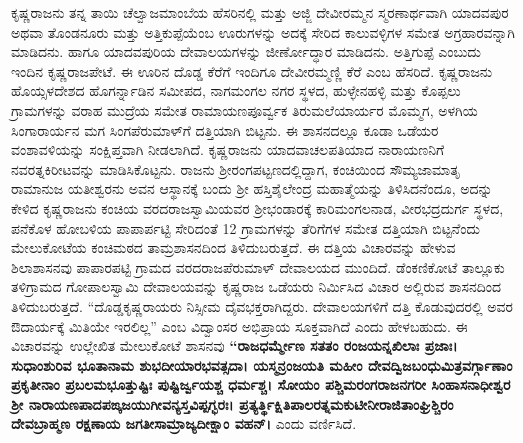 ಕೃಷ್ಣರಾಜನು ತನ್ನ ತಾಯಿ ಚೆಲ್ವಾಜಮಾಂಬೆಯ ಹೆಸರಿನಲ್ಲಿ ಮತ್ತು ಅಜ್ಜಿ ದೇವೀರಮ್ಮನ ಸ್ಮರಣಾರ್ಥವಾಗಿ ಯಾದವಪುರ ಅಥವಾ ತೊಂಡನೂರು ಮತ್ತು ಅತ್ತಿಕುಪ್ಪೆಯೆಂಬ ಊರುಗಳನ್ನು ಅದಕ್ಕೆ ಸೇರಿದ ಕಾಲುವಳ್ಳಿಗಳ ಸಮೇತ ಅಗ್ರಹಾರವನ್ನಾಗಿ ಮಾಡಿದನು. ಹಾಗೂ ಯಾದವಪುರಿಯ ದೇವಾಲಯಗಳನ್ನು ಜೀರ್ಣೋದ್ಧಾರ ಮಾಡಿದನು. ಅತ್ತಿಗುಪ್ಪೆ ಎಂಬುದು ಇಂದಿನ ಕೃಷ್ಣರಾಜಪೇಟೆ. ಈ ಊರಿನ ದೊಡ್ಡ ಕೆರೆಗೆ ಇಂದಿಗೂ ದೇವೀರಮ್ಮಣ್ಣಿ ಕೆರೆ ಎಂಬ ಹೆಸರಿದೆ. ಕೃಷ್ಣರಾಜನು ಹೊಯ್ಸಳದೇಶದ ಹೊಗರ್ನ್ನಾಡಿನ ಸಮೀಪದ, ನಾಗಮಂಗಲ ನಗರ ಸ್ಥಳದ, ಹುಳ್ಳೇನಹಳ್ಳಿ ಮತ್ತು ಕೊಪ್ಪಲು ಗ್ರಾಮಗಳನ್ನು ವರಾಹ ಮುದ್ರೆಯ ಸಮೇತ ರಾಮಾಯಣಪೂರ್ವ್ವಕ ತಿರುಮಲೆಯಾರ್ಯರ ಮೊಮ್ಮಗ, ಅಳಗಿಯ ಸಿಂಗಾರಾರ್ಯನ ಮಗ ಸಿಂಗಪೆರುಮಾಳ್​ಗೆ ದತ್ತಿಯಾಗಿ ಬಿಟ್ಟನು. ಈ ಶಾಸನದಲ್ಲೂ ಕೂಡಾ ಒಡೆಯರ ವಂಶಾವಳಿಯನ್ನು ಸಂಕ್ಷಿಪ್ತವಾಗಿ ನೀಡಲಾಗಿದೆ. ಕೃಷ್ಣರಾಜನು ಯಾದವಾಚಲಪತಿಯಾದ ನಾರಾಯಣನಿಗೆ ನವರತ್ನಕಿರೀಟವನ್ನು ಮಾಡಿಸಿಕೊಟ್ಟನು. ರಾಜನು ಶ‍್ರೀರಂಗಪಟ್ಟಣದಲ್ಲಿದ್ದಾಗ, ಕಂಚಿಯಿಂದ ಸೌಮ್ಯಜಾಮಾತೃ ರಾಮಾನುಜ ಯತೀಶ್ವರನು ಅವನ ಆಸ್ಥಾನಕ್ಕೆ ಬಂದು ಶ‍್ರೀ ಹಸ್ತಿಶೈಲೇಂದ್ರ ಮಹಾತ್ಮೆಯನ್ನು ತಿಳಿಸಿದನೆಂದೂ, ಅದನ್ನು ಕೇಳಿದ ಕೃಷ್ಣರಾಜನು ಕಂಚಿಯ ವರದರಾಜಸ್ವಾಮಿಯವರ ಶ‍್ರೀಭಂಡಾರಕ್ಕೆ ಕಾರಿಮಂಗಲನಾಡ, ವೀರಭದ್ರದುರ್ಗ ಸ್ಥಳದ, ಪನೆಕೊಳ ಹೋಬಳಿಯ ಪಾಪಾರ್ಪಟ್ಟಿ ಸೇರಿದಂತೆ 12 ಗ್ರಾಮಗಳನ್ನು ತೆರಿಗೆಗಳ ಸಮೇತ ದತ್ತಿಯಾಗಿ ಬಿಟ್ಟನೆಂದು ಮೇಲುಕೋಟೆಯ ಕಂಚಿಮಠದ ತಾಮ್ರಶಾಸನದಿಂದ ತಿಳಿದುಬರುತ್ತದೆ. ಈ ದತ್ತಿಯ ವಿಚಾರವನ್ನು ಹೇಳುವ ಶಿಲಾಶಾಸನವು ಪಾಪಾರಪಟ್ಟಿ ಗ್ರಾಮದ ವರದರಾಜಪೆರುಮಾಳ್​ ದೇವಾಲಯದ ಮುಂದಿದೆ. ಡೆಂಕಣಿಕೋಟೆ ತಾಲ್ಲೂಕು ತಳಿಗ್ರಾಮದ ಗೋಪಾಲಸ್ವಾಮಿ ದೇವಾಲಯವನ್ನು ಕೃಷ್ಣರಾಜ ಒಡೆಯರು ನಿರ್ಮಿಸಿದ ವಿಚಾರ ಅಲ್ಲಿರುವ ಶಾಸನದಿಂದ ತಿಳಿದುಬರುತ್ತದೆ. “ದೊಡ್ಡಕೃಷ್ಣರಾಯರು ನಿಸ್ಸೀಮ ದೈವಭಕ್ತರಾಗಿದ್ದರು. ದೇವಾಲಯಗಳಿಗೆ ದತ್ತಿ ಕೊಡುವುದರಲ್ಲಿ ಅವರ ಔದಾರ್ಯಕ್ಕೆ ಮಿತಿಯೇ ಇರಲಿಲ್ಲ” ಎಂಬ ವಿದ್ವಾಂಸರ ಅಭಿಪ್ರಾಯ ಸೂಕ್ತವಾಗಿದೆ ಎಂದು ಹೇಳಬಹುದು. ಈ ವಿಚಾರವನ್ನು ಉಲ್ಲೇಖಿತ ಮೇಲುಕೋಟೆ ಶಾಸನವು \textbf{“ರಾಜಧರ್ಮ್ಮೇಣ ಸತತಂ ರಂಜಯನ್ನಖಿಲಾಃ ಪ್ರಜಾಃ। ಸುಧಾಂಶುರಿವ\general{\break } ಭೂತಾನಾಮ ಶುಭದೀಯಾರಭವತ್ಸದಾ। ಯಸ್ಮನ್ರಂಜಯತಿ ಮಹೀಂ ದೇವದ್ವಿಜಬಂಧುಮಿತ್ರವರ್ಗ್ಗಾಣಾಂ ಪ್ರಕೃತೀನಾಂ\general{\break } ಪ್ರಬಲಮಭೂತ್ತುಷ್ಟಿಃ ಪುಷ್ಟಿರ್ಜ್ವಯಶ್ಚ ಧರ್ಮಶ್ಚ। ಸೋಯಂ ಪಶ್ಚಿಮರಂಗರಾಜನಗರೀ ಸಿಂಹಾಸನಾಧೀಶ್ವರ\general{\break } ಶ‍್ರೀ ನಾರಾಯಣಪಾದಪಙ್ಕಜಯುಗೀವನ್ಯಸ್ತವಿಪ್ಪಗ್ಭರಃ। ಪ್ರತ್ಯರ್ತ್ಥಿಕ್ಷಿತಿಪಾಲರತ್ನಮಕುಟೀನೀರಾಜಿತಾಂಘ್ರಿಶ್ಚಿರಂ ದೇವಬ್ರಾಹ್ಮಣ ರಕ್ಷಣಾಯ ಜಗತೀಸಾಮ್ರಾಜ್ಯದೀಕ್ಷಾಂ ವಹನ್​। } ಎಂದು ವರ್ಣಿಸಿದೆ.

